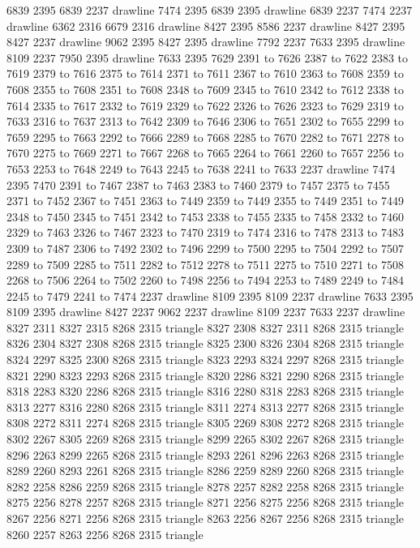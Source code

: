 6839 2395 6839 2237 drawline
7474 2395 6839 2395 drawline
6839 2237 7474 2237 drawline
6362 2316 6679 2316 drawline
8427 2395 8586 2237 drawline
8427 2395 8427 2237 drawline
9062 2395 8427 2395 drawline
7792 2237 7633 2395 drawline
8109 2237 7950 2395 drawline
7633 2395 7629 2391 to 7626 2387 to 7622 2383 to 7619 2379 to 7616 2375 to 7614 2371 to 7611 2367 to 7610 2363 to 7608 2359 to 7608 2355 to 7608 2351 to 7608 2348 to 7609 2345 to 7610 2342 to 7612 2338 to 7614 2335 to 7617 2332 to 7619 2329 to 7622 2326 to 7626 2323 to 7629 2319 to 7633 2316 to 7637 2313 to 7642 2309 to 7646 2306 to 7651 2302 to 7655 2299 to 7659 2295 to 7663 2292 to 7666 2289 to 7668 2285 to 7670 2282 to 7671 2278 to 7670 2275 to 7669 2271 to 7667 2268 to 7665 2264 to 7661 2260 to 7657 2256 to 7653 2253 to 7648 2249 to 7643 2245 to 7638 2241 to 7633 2237 drawline
7474 2395 7470 2391 to 7467 2387 to 7463 2383 to 7460 2379 to 7457 2375 to 7455 2371 to 7452 2367 to 7451 2363 to 7449 2359 to 7449 2355 to 7449 2351 to 7449 2348 to 7450 2345 to 7451 2342 to 7453 2338 to 7455 2335 to 7458 2332 to 7460 2329 to 7463 2326 to 7467 2323 to 7470 2319 to 7474 2316 to 7478 2313 to 7483 2309 to 7487 2306 to 7492 2302 to 7496 2299 to 7500 2295 to 7504 2292 to 7507 2289 to 7509 2285 to 7511 2282 to 7512 2278 to 7511 2275 to 7510 2271 to 7508 2268 to 7506 2264 to 7502 2260 to 7498 2256 to 7494 2253 to 7489 2249 to 7484 2245 to 7479 2241 to 7474 2237 drawline
8109 2395 8109 2237 drawline
7633 2395 8109 2395 drawline
8427 2237 9062 2237 drawline
8109 2237 7633 2237 drawline
8327 2311 8327 2315 8268 2315 triangle
8327 2308 8327 2311 8268 2315 triangle
8326 2304 8327 2308 8268 2315 triangle
8325 2300 8326 2304 8268 2315 triangle
8324 2297 8325 2300 8268 2315 triangle
8323 2293 8324 2297 8268 2315 triangle
8321 2290 8323 2293 8268 2315 triangle
8320 2286 8321 2290 8268 2315 triangle
8318 2283 8320 2286 8268 2315 triangle
8316 2280 8318 2283 8268 2315 triangle
8313 2277 8316 2280 8268 2315 triangle
8311 2274 8313 2277 8268 2315 triangle
8308 2272 8311 2274 8268 2315 triangle
8305 2269 8308 2272 8268 2315 triangle
8302 2267 8305 2269 8268 2315 triangle
8299 2265 8302 2267 8268 2315 triangle
8296 2263 8299 2265 8268 2315 triangle
8293 2261 8296 2263 8268 2315 triangle
8289 2260 8293 2261 8268 2315 triangle
8286 2259 8289 2260 8268 2315 triangle
8282 2258 8286 2259 8268 2315 triangle
8278 2257 8282 2258 8268 2315 triangle
8275 2256 8278 2257 8268 2315 triangle
8271 2256 8275 2256 8268 2315 triangle
8267 2256 8271 2256 8268 2315 triangle
8263 2256 8267 2256 8268 2315 triangle
8260 2257 8263 2256 8268 2315 triangle
